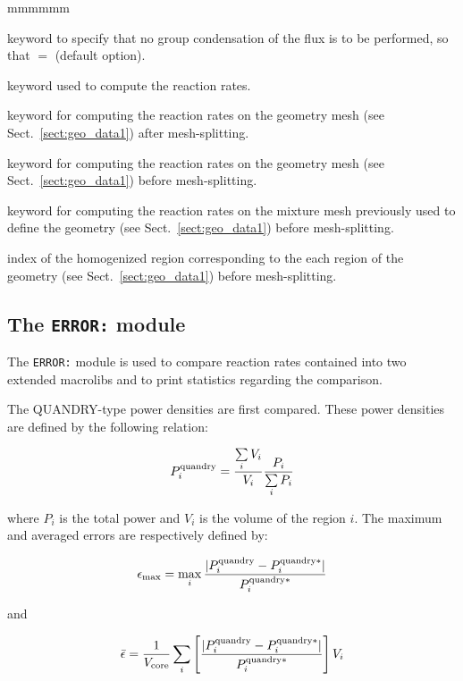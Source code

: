 \begin{ListeDeDescription}{mmmmmm}
\item[\moc{NONE}] keyword to specify that no group condensation of the flux is
to be performed, so that $=$ (default option).

\item[\moc{INTG}] keyword used to compute the reaction rates.

\item[\moc{NONE}] keyword for computing the reaction rates on the geometry mesh (see Sect.~\ref{sect:geo_data1}) after mesh-splitting.

\item[\moc{IN}] keyword for computing the reaction rates on the geometry mesh (see Sect.~\ref{sect:geo_data1}) before mesh-splitting.

\item[\moc{MIX}] keyword for computing the reaction rates on the mixture mesh previously used to define the geometry (see Sect.~\ref{sect:geo_data1}) before mesh-splitting.

\item[\dusa{ihom}] index of the homogenized region corresponding to the each region of the geometry (see Sect.~\ref{sect:geo_data1}) before mesh-splitting.

\end{ListeDeDescription}
\clearpage

\subsection{The {\tt ERROR:} module}

The {\tt ERROR:} module is used to compare reaction rates contained into two extended {\sc macrolibs} and to print statistics regarding the comparison.

\vskip 0.2cm

The QUANDRY-type power densities are first compared. These power densities are defined by the following relation:

$$P^{\rm quandry}_i={\sum\limits_i V_i \over V_i} {P_i \over \sum\limits_i P_i}$$

\noindent where $P_i$ is the total power and $V_i$ is the volume of the  region $i$. The maximum and averaged errors are respectively defined by:

$$\epsilon_{\rm max}=\max_i {|P_i^{\rm quandry}-P_i^{{\rm quandry}*}| \over P_i^{{\rm quandry}*}}$$

\noindent and

$$\bar\epsilon = {1 \over V_{\rm core}} \sum_i \left[ {|P_i^{\rm quandry}-P_i^{{\rm quandry}*}| \over P_i^{{\rm quandry}*}}\right] V_i$$

